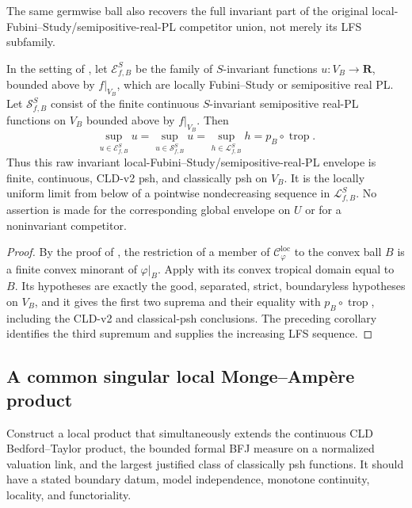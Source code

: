 The same germwise ball also recovers the full invariant part of the original
local-Fubini--Study/semipositive-real-PL competitor union, not merely its LFS
subfamily.
\begin{corollary}
\label{cor:p033-invariant-toric-germwise-full-envelope}
In the setting of
, let
\(\mathcal E^S_{f,B}\) be the family of \(S\)-invariant functions
\(u:V_B\to\mathbf R\), bounded above by \(f|_{V_B}\), which are locally
Fubini--Study or semipositive real PL.  Let \(\mathcal S^S_{f,B}\) consist
of the finite continuous \(S\)-invariant semipositive real-PL functions on
\(V_B\) bounded above by \(f|_{V_B}\).  Then
\[
 \sup_{u\in\mathcal E^S_{f,B}}u
 =\sup_{u\in\mathcal S^S_{f,B}}u
 =\sup_{h\in\mathcal L^S_{f,B}}h
 =p_B\circ\operatorname{trop}.
\]
Thus this raw invariant local-Fubini--Study/semipositive-real-PL envelope is
finite, continuous, CLD-v2 psh, and classically psh on \(V_B\).  It is the
locally uniform limit from below of a pointwise nondecreasing sequence in
\(\mathcal L^S_{f,B}\).  No assertion is made for the corresponding global
envelope on \(U\) or for a noninvariant competitor.
\end{corollary}
\begin{proof}
By the proof of
, the restriction of a
member of \(\mathcal C^{\mathrm{loc}}_\varphi\) to the convex ball \(B\)
is a finite convex minorant of \(\varphi|_B\).  Apply
 with its
convex tropical domain equal to \(B\).  Its hypotheses are exactly the
good, separated, strict, boundaryless hypotheses on \(V_B\), and it gives
the first two suprema and their equality with \(p_B\circ\operatorname{trop}\),
including the CLD-v2 and classical-psh conclusions.  The preceding corollary
identifies the third supremum and supplies the increasing LFS sequence.
\end{proof}

\subsection{A common singular local Monge--Ampère product}
\label{sec:ch72-local-ma}

\begin{problem}\label{prob:frontier-local-ma}
Construct a local product that simultaneously extends the continuous CLD
Bedford--Taylor product, the bounded formal BFJ measure on a normalized
valuation link, and the largest justified class of classically psh functions.
It should have a stated boundary datum, model independence, monotone
continuity, locality, and functoriality.
\end{problem}

